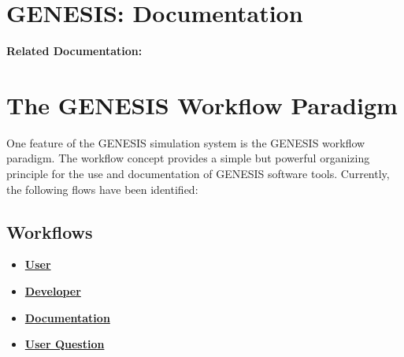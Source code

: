 \documentclass[12pt]{article}
\begin{document}
\section*{GENESIS: Documentation}

{\bf Related Documentation:}

\section*{The GENESIS Workflow Paradigm}

One feature of the GENESIS simulation system is the GENESIS workflow paradigm. The workflow concept provides a simple but powerful organizing principle for the use and documentation of GENESIS software tools. Currently, the following flows have been identified:

\subsection*{Workflows}
\begin{itemize}
\item \href {../workflow-user/workflow-user.tex}{\bf User}
\item \href{../workflow-developer/workflow-developer.tex}{\bf Developer}
\item \href{../workflow-documentation/workflow-documentation.tex}{\bf Documentation}
\item \href{../workflow-user-query/workflow-user-query.tex}{\bf User Question}
\end{itemize}
\end{document}
